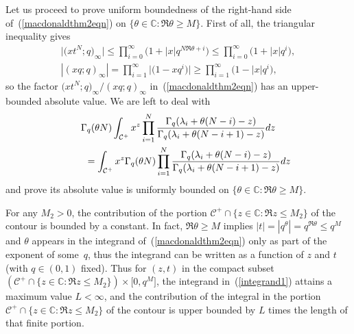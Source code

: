 \documentclass[11pt]{article}
\numberwithin{equation}{section}
\newcommand{\C}{\mathbb{C}}
\newcommand{\CC}{\mathcal{C}}
\begin{document}
Let us proceed to prove uniform boundedness of the right-hand side of~(\ref{macdonaldthm2eqn}) on $\{\theta\in\C\colon \Re\theta \geq M\}$. First of all, the triangular inequality gives
\begin{gather*}
\big|\big(xt^N; q\big)_{\infty}\big| \leq \prod_{i=0}^{\infty}{\big(1 + |x| q^{N\Re\theta + i}\big)} \leq \prod_{i=0}^{\infty}{\big(1 + |x| q^i\big)}, \\ |(xq; q)_{\infty}| = \prod_{i=1}^{\infty}{\big|\big(1 - xq^i\big)\big|} \geq \prod_{i=1}^{\infty}{\big(1 - |x| q^i\big)},
\end{gather*}
so the factor $\big(xt^N; q\big)_{\infty}/(xq; q)_{\infty}$ in~(\ref{macdonaldthm2eqn}) has an upper-bounded absolute value. We are left to deal with
\begin{gather}
\Gamma_q(\theta N)\int_{\CC^+}{x^z \prod_{i=1}^N{\frac{\Gamma_q(\lambda_i + \theta(N - i) - z)}{\Gamma_q(\lambda_i + \theta(N - i + 1) - z)}} {\rm d}z}\nonumber\\
 \qquad {} = \int_{\CC^+}{x^z \Gamma_q(\theta N)\prod_{i=1}^N{\frac{\Gamma_q(\lambda_i + \theta(N - i) - z)}{\Gamma_q(\lambda_i + \theta(N - i + 1) - z)}}{\rm d}z}\label{integrand1}
\end{gather}
and prove its absolute value is uniformly bounded on $\{\theta\in\C \colon \Re\theta \geq M\}$.

For any $M_2 > 0$, the contribution of the portion $\CC^+ \cap \{z\in\C \colon \Re z \leq M_2\}$ of the contour is bounded by a constant. In fact, $\Re\theta \geq M$ implies $|t| = |q^{\theta}| = q^{\Re\theta} \leq q^M$ and $\theta$ appears in the integrand of~(\ref{macdonaldthm2eqn}) only as part of the exponent of some~$q$, thus the integrand can be written as a function of $z$ and $t$ (with $q\in (0, 1)$ f\/ixed). Thus for $(z, t)$ in the compact subset $(\CC^+ \cap \{z\in\C\colon \Re z \leq M_2\})\times \big[0, q^M\big]$, the integrand in~(\ref{integrand1}) attains a maximum value $L < \infty$, and the contribution of the integral in the portion $\CC^+ \cap \{z\in\C\colon \Re z \leq M_2\}$ of the contour is upper bounded by $L$ times the length of that f\/inite portion.
\end{document}
